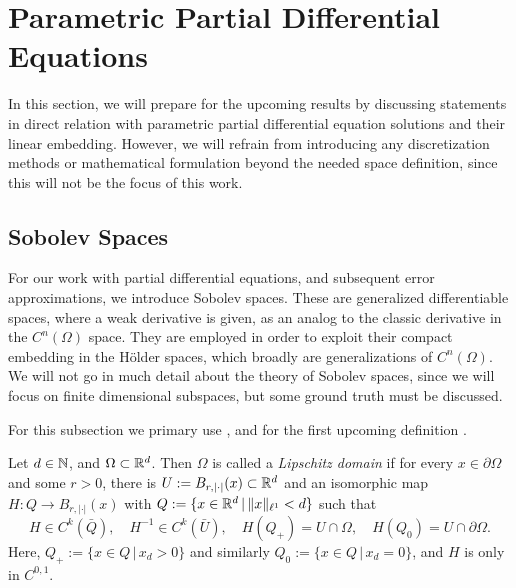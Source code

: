 \section{Parametric Partial Differential Equations}


In this section, we will prepare for the upcoming results by discussing statements in direct relation with 
parametric partial differential equation solutions and their linear embedding. 
However, we will refrain from introducing any discretization
methods or mathematical formulation beyond the needed space definition, since this will not be the focus 
of this work. 



\subsection{Sobolev Spaces}




For our work with partial differential equations, and subsequent error approximations, we introduce
Sobolev spaces. These are generalized differentiable spaces, where a weak derivative is given, as an analog to the
classic derivative in the $C^n(\Omega)$ 
space. They are employed in order to exploit their compact embedding in the Hölder spaces, which broadly are generalizations
of $C^n(\Omega)$. We will not go in much detail about the theory of Sobolev spaces, since we will focus on
finite dimensional subspaces, but some ground truth must be discussed. 

For this subsection we primary use \cite{alt2016}, and for the first upcoming definition \cite{dacorogna2004}.

\begin{definition}
    Let $d \in \mathbb{N}$, and $\Omega \subset \mathbb{R}^d$. Then $\Omega$ is called a \emph{Lipschitz domain} if for every
    $x \in \partial \Omega$ and some $r > 0$, there is $U := B_{r, \vert \cdot \vert}(x) \subset \mathbb{R}^d$ and an isomorphic
    map $H: Q \to B_{r, \vert \cdot \vert}(x)$ with $Q := \{ x \in \mathbb{R}^d \, \vert \, \lVert x \rVert_{\ell^1} < d \}$ such that
    \begin{equation*}
        H \in C^k(\bar{Q}), \quad H^{-1} \in C^k(\bar{U}), \quad 
        H(Q_+) = U \cap \Omega, \quad H(Q_0) = U \cap \partial \Omega.
    \end{equation*}
    Here, $Q_+ := \{x \in Q \, \vert \, x_d > 0\}$ and similarly $Q_0 := \{x \in Q \, \vert \, x_d = 0 \}$,
    and $H$ is only in $C^{0, 1}$.
\end{definition}

